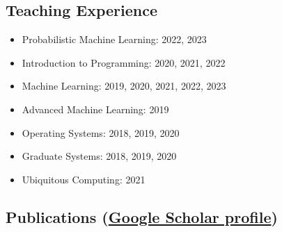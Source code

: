 \documentclass[letter,10pt]{article}
\begin{document}
\subsection*{\sc \textbf{Teaching Experience}\hspace{5pt}\noindent\hrulefill}


\begin{itemize}

\item[]
    Probabilistic Machine Learning: 2022, 2023
\item[]
    Introduction to Programming: 2020, 2021, 2022
 \item[]
   Machine Learning: 2019, 2020, 2021, 2022, 2023
    \item[]
   Advanced Machine Learning: 2019
 \item[]
    Operating Systems: 2018, 2019, 2020
 \item[]
  Graduate Systems: 2018, 2019, 2020
\item[]
   Ubiquitous Computing: 2021
  

\end{itemize}




\subsection*{{\sc \textbf{Publications} (\href{https://scholar.google.com/citations?user=rFGzHlIAAAAJ&hl=en}{Google Scholar profile})}\hspace{5pt}\noindent\hrulefill}
\end{document}
